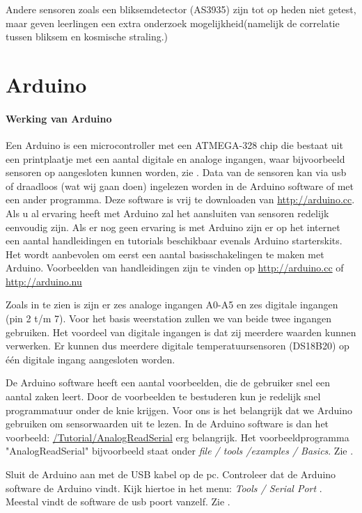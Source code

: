 Andere sensoren zoals een bliksemdetector (AS3935) zijn tot op heden
niet getest, maar geven leerlingen een extra onderzoek
mogelijkheid(namelijk de correlatie tussen bliksem en kosmische
straling.)

\section{Arduino}

\paragraph{Werking van Arduino}

Een Arduino is een microcontroller met een ATMEGA-328 chip die bestaat
uit een printplaatje met een aantal digitale en analoge ingangen, waar
bijvoorbeeld sensoren op aangesloten kunnen worden, zie
. Data van de sensoren kan via usb of draadloos (wat
wij gaan doen) ingelezen worden in de Arduino software of met een ander
programma. Deze software is vrij te downloaden van
\url{http://arduino.cc}. Als u al ervaring heeft met Arduino zal het
aansluiten van sensoren redelijk eenvoudig zijn. Als er nog geen
ervaring is met Arduino zijn er op het internet een aantal handleidingen
en tutorials beschikbaar evenals Arduino starterskits. Het wordt
aanbevolen om eerst een aantal basisschakelingen te maken met Arduino.
Voorbeelden van handleidingen zijn te vinden  op \url{http://arduino.cc}
of \url{http://arduino.nu}

Zoals in  te zien is zijn er zes analoge ingangen
A0-A5 en zes digitale ingangen (pin 2 t/m 7). Voor het basis weerstation
zullen we van beide twee ingangen gebruiken. Het voordeel van digitale
ingangen is dat zij meerdere waarden kunnen verwerken. Er kunnen dus
meerdere digitale temperatuursensoren (DS18B20) op één digitale ingang
aangesloten worden.

De Arduino software heeft een aantal voorbeelden, die de gebruiker snel
een aantal zaken leert. Door de voorbeelden te bestuderen kun je
redelijk snel programmatuur onder de knie krijgen. Voor ons is het
belangrijk dat we Arduino gebruiken om sensorwaarden uit te lezen. In
de Arduino software is dan het voorbeeld:
\url{/Tutorial/AnalogReadSerial} erg belangrijk. Het voorbeeldprogramma
"AnalogReadSerial" bijvoorbeeld staat onder \emph{file / tools /examples /
Basics}. Zie .  

Sluit de Arduino aan met de USB kabel op de pc. Controleer dat de Arduino software
de Arduino vindt. Kijk hiertoe in het menu: \emph{ Tools / Serial Port }. Meestal vindt de software de usb poort vanzelf.
Zie .

